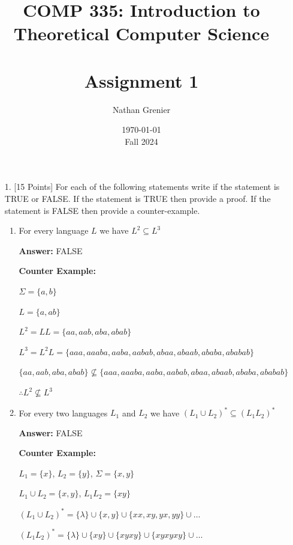 \documentclass[12pt]{article}
\title{COMP 335: Introduction to Theoretical Computer Science\\
\ \\
Assignment 1}
\author{Nathan Grenier}
\date{\today \\ Fall 2024}
\begin{document}
\begin{spacing}{1.5}
	\maketitle

	\newpage

	\begin{enumerate}

		\item[1.] [15 Points] For each of the following statements write if the statement is TRUE or FALSE. If the statement is TRUE then provide a proof. If the statement is FALSE then provide a counter-example.

		      \begin{enumerate}

			      \item For every language $L$ we have $L^2 \subseteq L^3$

			            \noindent \textbf{Answer:} FALSE

			            \noindent \textbf{Counter Example:}

			            $\Sigma = \{a,b \}$

			            $L=\{a, ab \}$

			            $L^2=LL=\{aa, aab, aba, abab \}$

			            $L^3=L^2L=\{aaa, aaaba, aaba, aabab, abaa, abaab, ababa, ababab \}$

			            $\{aa, aab, aba, abab \} \not\subseteq \{aaa, aaaba, aaba, aabab, abaa, abaab, ababa, ababab \}$

			            $\therefore L^2 \not\subseteq L^3$


			      \item For every two languages $L_1$ and $L_2$ we have $(L_1 \cup L_2)^* \subseteq (L_1L_2)^*$

			            \noindent \textbf{Answer:} FALSE

			            \noindent \textbf{Counter Example:}

			            $L_1 = \{x \}$, $L_2= \{y \}$, $\Sigma = \{x,y \}$

			            $L_1 \cup L_2 = \{x,y \}$, $L_1L_2 = \{xy \}$

			            $(L_1 \cup L_2)^* = \{\lambda \} \cup \{x,y \} \cup \{xx, xy, yx, yy \} \cup \dots$

			            $(L_1L_2)^* = \{\lambda \} \cup \{xy \} \cup \{xyxy \} \cup \{xyxyxy \} \cup \dots$


\end{enumerate}
\end{enumerate}
\end{spacing}
\end{document}
